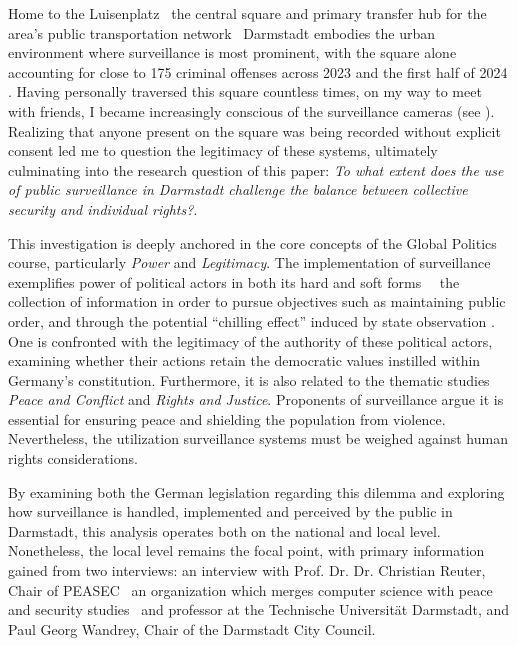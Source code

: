 \documentclass[12pt]{article}
\begin{document}
	Home to the Luisenplatz \textemdash\ the central square and primary transfer hub for the area's public transportation network \textemdash\ Darmstadt embodies the urban environment where surveillance is most prominent, with the square alone accounting for close to 175 criminal offenses across 2023 and the first half of 2024 \parencite{schonbein_weapon_2025}. Having personally traversed this square countless times, on my way to meet with friends, I became increasingly conscious of the surveillance cameras (see ). Realizing that anyone present on the square was being recorded without explicit consent led me to question the legitimacy of these systems, ultimately culminating into the research question of this paper: \textit{To what extent does the use of public surveillance in Darmstadt challenge the balance between collective security and individual rights?}.
	
	This investigation is deeply anchored in the core concepts of the Global Politics course, particularly \textit{Power} and \textit{Legitimacy}. The implementation of surveillance exemplifies power of political actors in both its hard and soft forms \parencite{courseCompanion2024}\ \textemdash\ the collection of information in order to pursue objectives such as maintaining public order, and through the potential ``chilling effect'' induced by state observation \parencite{murray2024}. One is confronted with the legitimacy of the authority of these political actors, examining whether their actions retain the democratic values instilled within Germany's constitution. Furthermore, it is also related to the thematic studies \textit{Peace and Conflict} and \textit{Rights and Justice}. Proponents of surveillance argue it is essential for ensuring peace and shielding the population from violence. Nevertheless, the utilization surveillance systems must be weighed against human rights considerations.
	
	By examining both the German legislation regarding this dilemma and exploring how surveillance is handled, implemented and perceived by the public in Darmstadt, this analysis operates both on the national and local level. Nonetheless, the local level remains the focal point, with primary information gained from two interviews: an interview with Prof. Dr. Dr. Christian Reuter, Chair of PEASEC \textemdash\ an organization which merges computer science with peace and security studies \parencite{noauthor_peasec_2025} \textemdash\ and professor at the Technische Universität Darmstadt, and Paul Georg Wandrey, Chair of the Darmstadt City Council.
	
\end{document}
